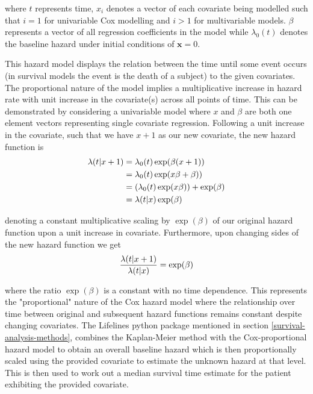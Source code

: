 \documentclass{l4proj}
\begin{document}
where \(t\) represents time, \textbf{\(x_i\)} denotes a vector of each covariate being modelled such that \(i=1\) for univariable Cox modelling and \(i > 1\) for multivariable models. \(\beta\) represents a vector of all regression coefficients in the model while \(\lambda_0 (t)\) denotes the baseline hazard under initial conditions of \(\textbf{x} = 0\). 

This hazard model displays the relation between the time until some event occurs (in survival models the event is the death of a subject) to the given covariates. The proportional nature of the model implies a multiplicative increase in hazard rate with unit increase in the covariate(s) across all points of time. This can be demonstrated by considering a univariable model where \(x\) and \(\beta\) are both one element vectors representing single covariate regression. Following a unit increase in the covariate, such that we have \(x + 1\) as our new covariate, the new hazard function is
\begin{equation}
    \centering
    \begin{aligned}
        \lambda (t | x + 1) ={}& \lambda_0 (t) \exp (\beta (x+1)) \\
                            ={}& \lambda_0 (t) \exp (x\beta  + \beta)) \\
                            ={}& (\lambda_0 (t) \exp (x\beta)) + \exp (\beta) \\
                            ={}& \lambda (t | x ) \exp (\beta)
    \end{aligned}
\end{equation}

denoting a constant multiplicative scaling by \(\exp (\beta)\) of our original hazard function upon a unit increase in covariate. Furthermore, upon changing sides of the new hazard function we get
\begin{equation}
    \centering
    \begin{aligned}
        \frac{\lambda (t | x + 1)}{\lambda (t | x )} = \exp (\beta) 
    \end{aligned}
\end{equation}

where the ratio \(\exp (\beta)\) is a constant with no time dependence. This represents the "proportional" nature of the Cox hazard model where the relationship over time between original and subsequent hazard functions remains constant despite changing covariates. The Lifelines python package mentioned in section \ref{survival-analysis-methods}, combines the Kaplan-Meier method with the Cox-proportional hazard model to obtain an overall baseline hazard which is then proportionally scaled using the provided covariate to estimate the unknown hazard at that level. This is then used to work out a median survival time estimate for the patient exhibiting the provided covariate.
\end{document}

